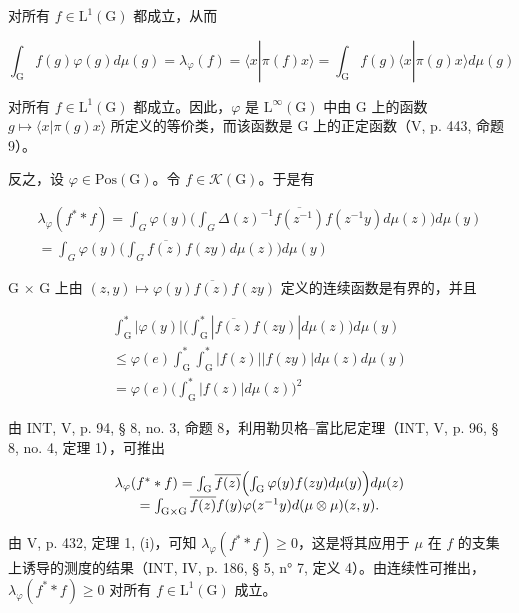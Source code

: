 对所有 \(f\in \mathrm{L}^1 (\mathrm{G})\) 都成立，从而

\[
\int_ {\mathrm{G}} f (g) \varphi (g) d \mu (g) = \lambda_ {\varphi} (f) = \langle x | \pi (f) x \rangle = \int_ {\mathrm{G}} f (g) \langle x | \pi (g) x \rangle d \mu (g)
\]

对所有 \(f \in \mathrm{L}^{1}(\mathrm{G})\) 都成立。因此，\(\varphi\) 是 \(\mathrm{L}^{\infty}(\mathrm{G})\) 中由 G 上的函数 \(g \mapsto \langle x | \pi(g)x \rangle\) 所定义的等价类，而该函数是 G 上的正定函数（V, p. 443, 命题 9）。

反之，设 \(\varphi\in\mathrm{Pos}(\mathrm{G})\)。令 \(f\in\mathcal{K}(\mathrm{G})\)。于是有

\[
\begin{array}{c} \lambda_ {\varphi} (f ^ {*} * f) = \int_ {G} \varphi (y) \Big (\int_ {G} \Delta (z) ^ {- 1} \overline {{f (z ^ {- 1})}} f (z ^ {- 1} y) d \mu (z) \Big) d \mu (y) \\ = \int_ {G} \varphi (y) \Big (\int_ {G} \overline {{f (z)}} f (z y) d \mu (z) \Big) d \mu (y) \end{array}
\]

G × G 上由 \((z, y) \mapsto \varphi(y)\overline{f(z)}f(zy)\) 定义的连续函数是有界的，并且

\[
\begin{array}{c} \int_ {\mathrm{G}} ^ {*} | \varphi (y) | \Big (\int_ {\mathrm{G}} ^ {*} | \overline {{f (z)}} f (z y) | d \mu (z) \Big) d \mu (y) \\ \leqslant \varphi (e) \int_ {\mathrm{G}} ^ {*} \int_ {\mathrm{G}} ^ {*} | f (z) | | f (z y) | d \mu (z) d \mu (y) \\ = \varphi (e) \Big (\int_ {\mathrm{G}} ^ {*} | f (z) | d \mu (z) \Big) ^ {2} \end{array}
\]

由 INT, V, p. 94, § 8, no. 3, 命题 8，利用勒贝格–富比尼定理（INT, V, p. 96, § 8, no. 4, 定理 1），可推出

\[
\begin{array}{c} \lambda_ {\varphi} (f ^ {*} * f) = \int_ {\mathrm{G}} \overline {{f (z)}} \Bigl (\int_ {\mathrm{G}} \varphi (y) f (z y) d \mu (y) \Bigr) d \mu (z) \\ = \int_ {\mathrm{G} \times \mathrm{G}} \overline {{f (z)}} f (y) \varphi (z ^ {- 1} y) d (\mu \otimes \mu) (z, y). \end{array}
\]

由 V, p. 432, 定理 1, (i)，可知 \(\lambda_{\varphi}(f^{*} * f) \geqslant 0\)，这是将其应用于 \(\mu\) 在 \(f\) 的支集上诱导的测度的结果（INT, IV, p. 186, § 5, n° 7, 定义 4）。由连续性可推出，\(\lambda_{\varphi}(f^{*} * f) \geqslant 0\) 对所有 \(f \in \mathrm{L}^1(\mathrm{G})\) 成立。

